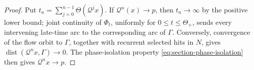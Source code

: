 \begin{proof}
Put
\(t_n=\sum_{j=0}^{n-1}\Theta(\mathcal Q^j x)\).  If
\(\mathcal Q^n(x)\to p\), then \(t_n\to\infty\) by the positive lower bound;
joint continuity of \(\Phi_t\), uniformly for
\(0\le t\le\Theta_+\), sends every intervening late-time arc to the
corresponding arc of \(\Gamma\).  Conversely, convergence of the flow orbit
to \(\Gamma\), together with recurrent selected hits in \(N\), gives
\(\operatorname{dist}(\mathcal Q^n x,\Gamma)\to0\).  The phase-isolation
property \cref{eq:section-phase-isolation} then gives
\(\mathcal Q^n x\to p\).
\end{proof}

